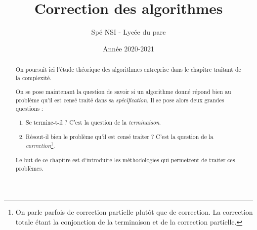 



\author{Spé NSI - Lycée du parc}  %
\title{Correction des algorithmes}  %
\date{Année 2020-2021} %
\renewcommand{\thesection}{\Roman{section}}  %
\pagestyle{fancy}



\fancyfoot[C]{\thepage} %
\fancyfoot[L]{} %
\fancyfoot[R]{} %
\newcommand{\p}[1]{ \left( #1 \right)}   %
\newcommand\abs[1]{|{#1}|}



\maketitle  %
\thispagestyle{empty}
\vskip 1cm
\renewcommand{\abstractname}{Introduction\hfill}
\begin{abstract} 

On poursuit ici l'étude théorique des algorithmes entreprise dans le chapitre traitant de la complexité.

On se pose maintenant la question de savoir si un algorithme donné répond bien au problème qu'il est censé traité dans sa \emph{spécification}.
Il se pose alors deux grandes questions : 
\begin{enumerate}[-]
  \item Se termine-t-il ? C'est la question de la \emph{terminaison}.
  \item Résout-il bien le problème qu'il est censé traiter ? C'est la question de la \emph{correction}\footnote{On parle parfois de correction partielle plutôt que de correction. La correction totale étant la conjonction de la terminaison et de la correction partielle. }.
 
\end{enumerate}

Le but de ce chapitre est d'introduire les méthodologies qui permettent de traiter ces problèmes.
\end{abstract} 


